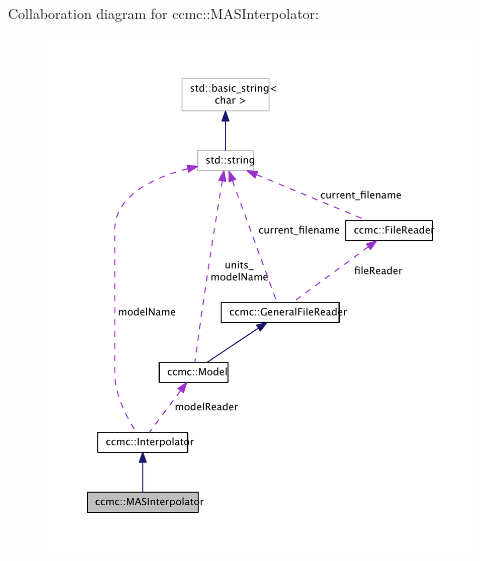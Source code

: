Collaboration diagram for ccmc\-:\-:M\-A\-S\-Interpolator\-:\nopagebreak
\begin{figure}[H]
\begin{center}
\leavevmode
\includegraphics[width=350pt]{classccmc_1_1_m_a_s_interpolator__coll__graph}
\end{center}
\end{figure}
